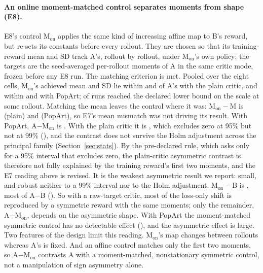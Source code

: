 \paragraph{An online moment-matched control separates moments from shape (E8).}
E8's control M$_{\mathrm{on}}$ applies the same kind of increasing affine map to B's reward, but re-sets its
constants before every rollout. They are chosen so that its training-reward mean and SD track A's, rollout by
rollout, under M$_{\mathrm{on}}$'s own policy; the targets are the seed-averaged per-rollout moments of A in the
same critic mode, frozen before any E8 run. The matching criterion is met. Pooled over the eight cells, M$_{\mathrm{on}}$'s
achieved mean and SD lie within \VeightMatchMeanPlain{} and \VeightMatchSdPlain{} of A's with the plain critic,
and within \VeightMatchMeanPop{} and \VeightMatchSdPop{} with PopArt; \VeightClamp{} of \VeightNA{} runs
reached the declared lower bound on the scale at some rollout. Matching the mean leaves the control where it
was: M$_{\mathrm{on}}-$M is \VeightMonMPlain{} (plain) and \VeightMonMPop{} (PopArt), so E7's mean mismatch was
not driving its result. With PopArt, A$-$M$_{\mathrm{on}}$ is \VeightAMonPop{}. With the plain critic it is
\VeightAMonPlain{}, which excludes zero at 95\% but not at 99\% (\VeightAMonPlainNine{}), and the contrast
does not survive the Holm adjustment across the principal family (Section~\ref{sec:stats}). By the
pre-declared rule, which asks only for a 95\% interval that excludes zero, the plain-critic asymmetric contrast is
therefore not fully explained by the training reward's first two moments, and the E7 reading above is revised. It is
the weakest asymmetric result we report: small, and robust neither to a 99\% interval nor to the Holm adjustment.
M$_{\mathrm{on}}-$B is \VeightMonBPlain{}, most of A$-$B (\VsevenABPlain{}). So with a raw-target critic, most of
the loss-only shift is reproduced by a symmetric reward with the same moments; only the remainder,
A$-$M$_{\mathrm{on}}$, depends on the asymmetric shape. With PopArt the moment-matched symmetric control has no detectable effect
(\VeightMonBPop{}), and the asymmetric effect is large. Two features of the design limit this reading.
M$_{\mathrm{on}}$'s map changes between rollouts whereas A's is fixed. And an affine control matches only the first
two moments, so A$-$M$_{\mathrm{on}}$ contrasts A with a moment-matched, nonstationary symmetric control, not a
manipulation of sign asymmetry alone.



